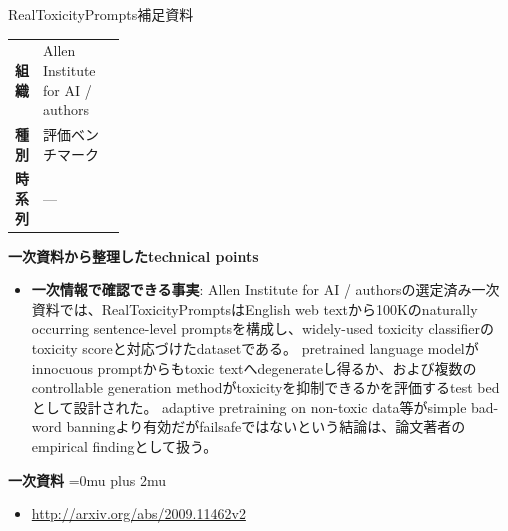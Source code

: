 \begin{technicalnote}{RealToxicityPrompts}{補足資料}
\begingroup
\begin{tabularx}{\linewidth}{@{}>{\bfseries}p{0.22\linewidth}X@{}}
組織 & Allen Institute for AI / authors \\
種別 & 評価ベンチマーク \\
時系列 & — \\
\end{tabularx}
\smallskip
{\bfseries 一次資料から整理したtechnical points}
\begin{itemize}[leftmargin=1.5em,itemsep=0.35em]
\item \textbf{一次情報で確認できる事実}: Allen Institute for AI / authorsの選定済み一次資料では、RealToxicityPromptsはEnglish web textから100Kのnaturally occurring sentence-level promptsを構成し、widely-used toxicity classifierのtoxicity scoreと対応づけたdatasetである。 pretrained language modelがinnocuous promptからもtoxic textへdegenerateし得るか、および複数のcontrollable generation methodがtoxicityを抑制できるかを評価するtest bedとして設計された。 adaptive pretraining on non-toxic data等がsimple bad-word banningより有効だがfailsafeではないという結論は、論文著者のempirical findingとして扱う。
\end{itemize}
\begin{minipage}{\linewidth}
\begin{samepage}
{\bfseries 一次資料}
\begingroup\sloppy
\Urlmuskip=0mu plus 2mu\relax
\begin{itemize}[leftmargin=1.5em,itemsep=0.25em]
\item {\scriptsize\url{http://arxiv.org/abs/2009.11462v2}}
\end{itemize}
\endgroup
\end{samepage}
\end{minipage}
\endgroup
\end{technicalnote}
\medskip
